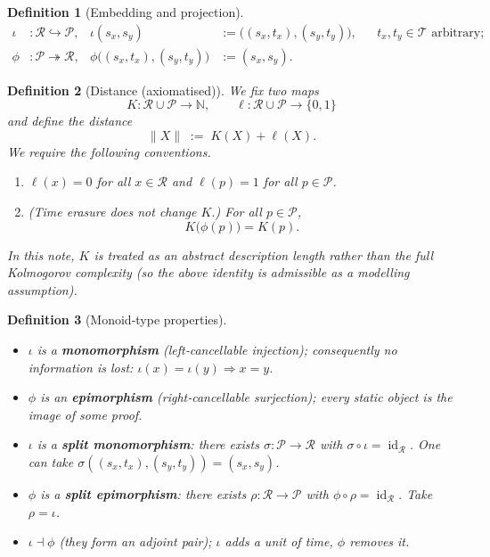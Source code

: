 \documentclass[12pt,a4paper]{article}
\newcommand{\Rep}{\mathcal{R}}           %
\newcommand{\Prf}{\mathcal{P}}           %
\newcommand{\Tset}{\mathcal{T}}          %
\newtheorem{definition}{Definition}[section]
\begin{document}
\begin{definition}[Embedding and projection]
$$
\begin{aligned}
\iota &: \Rep\hookrightarrow\Prf,
        &\iota(s_x,s_y)&:=\bigl((s_x,t_x),(s_y,t_y)\bigr),
        &&t_x,t_y\in\Tset\text{ arbitrary};\\[2mm]
\phi &: \Prf\twoheadrightarrow\Rep,
        &\phi\bigl((s_x,t_x),(s_y,t_y)\bigr)&:=(s_x,s_y).
\end{aligned}
$$
\end{definition}

\begin{definition}[Distance (axiomatised)]
We fix two maps
\[
  K:\Rep\cup\Prf\to\mathbb{N},
  \qquad
  \ell:\Rep\cup\Prf\to\{0,1\}
\]
and define the distance
\[
  \|X\|\;:=\;K(X)+\ell(X).
\]
We require the following conventions.
\begin{enumerate}[label=(D\arabic*)]
  \item $\ell(x)=0$ for all $x\in\Rep$ and $\ell(p)=1$ for all $p\in\Prf$.
  \item (Time erasure does not change $K$.) For all $p\in\Prf$,
        \[
          K\bigl(\phi(p)\bigr)=K(p).
        \]
\end{enumerate}
In this note, $K$ is treated as an abstract \emph{description length} rather
than the full Kolmogorov complexity (so the above identity is admissible as a
modelling assumption).
\end{definition}

\begin{definition}[Monoid‑type properties]
\begin{itemize}[nosep]
  \item $\iota$ is a \textbf{monomorphism} (left‑cancellable injection);
        consequently no information is lost:
        $\iota(x)=\iota(y)\Rightarrow x=y$.
  \item $\phi$ is an \textbf{epimorphism} (right‑cancellable surjection);
        every static object is the image of some proof.
  \item $\iota$ is a \textbf{split monomorphism}:
        there exists $\sigma:\Prf\to\Rep$ with $\sigma\circ\iota=\operatorname{id}_{\Rep}$.
        One can take $\sigma((s_x,t_x),(s_y,t_y))=(s_x,s_y)$.
  \item $\phi$ is a \textbf{split epimorphism}:
        there exists $\rho:\Rep\to\Prf$ with $\phi\circ\rho=\operatorname{id}_{\Rep}$.
        Take $\rho=\iota$.
  \item $\iota\dashv\phi$ (they form an adjoint pair); $\iota$ adds a unit of time,
        $\phi$ removes it.
\end{itemize}
\end{definition}
\end{document}
